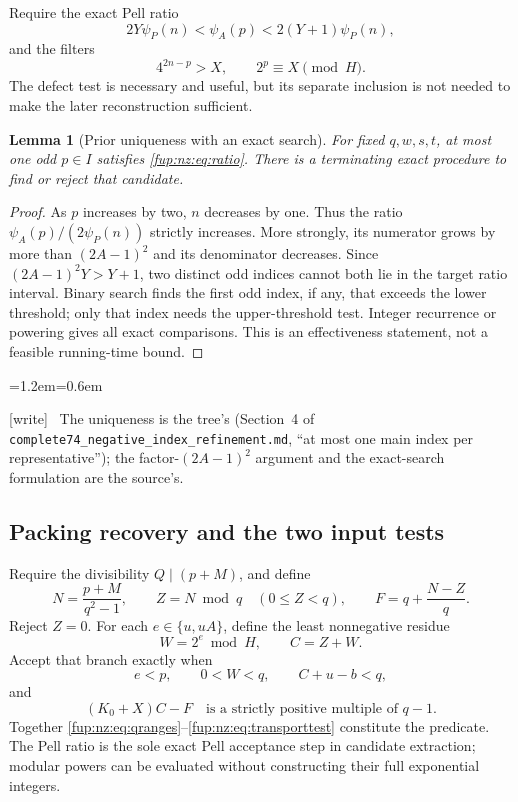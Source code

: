 \documentclass[11pt,letterpaper]{article}
\newtheorem{lemma}[theorem]{Lemma}
\theoremstyle{definition}\newtheorem{definition}[theorem]{Definition}
\theoremstyle{remark}\newtheorem{remark}[theorem]{Remark}
\newcommand{\wtag}{\textup{[write]}}
\newenvironment{writenote}{\par\smallskip\begin{list}{}{\leftmargin=1.2em\rightmargin=0.6em}\item[]\small\wtag\ }{\end{list}\smallskip}
\newcommand{\rw}[1]{\nolinkurl{#1}}%
\begin{document}
Require the exact Pell ratio
\begin{equation}\label{fup:nz:eq:ratio}
 2Y\psi_P(n)<\psi_A(p)<2(Y+1)\psi_P(n),
\end{equation}
and the filters
\begin{equation}\label{fup:nz:eq:mainfilters}
 4^{2n-p}>X,\qquad 2^p\equiv X\pmod H.
\end{equation}
The defect test is necessary and useful, but its separate inclusion is not needed to make the later reconstruction sufficient.

\begin{lemma}[Prior uniqueness with an exact search]\label{fup:nz:lem:unique}
For fixed $q,w,s,t$, at most one odd $p\in I$ satisfies \eqref{fup:nz:eq:ratio}. There is a terminating exact procedure to find or reject that candidate.
\end{lemma}
\begin{proof}
As $p$ increases by two, $n$ decreases by one. Thus the ratio $\psi_A(p)/(2\psi_P(n))$ strictly increases. More strongly, its numerator grows by more than $(2A-1)^2$ and its denominator decreases. Since $(2A-1)^2Y>Y+1$, two distinct odd indices cannot both lie in the target ratio interval. Binary search finds the first odd index, if any, that exceeds the lower threshold; only that index needs the upper-threshold test. Integer recurrence or powering gives all exact comparisons. This is an effectiveness statement, not a feasible running-time bound.
\end{proof}
\begin{writenote}
The uniqueness is the tree's (Section~4 of \rw{complete74_negative_index_refinement.md}, ``at most one main index per representative''); the factor-$(2A-1)^2$ argument and the exact-search formulation are the source's.
\end{writenote}

\subsection{Packing recovery and the two input tests}
Require the divisibility $Q\mid(p+M)$, and define
\begin{equation}\label{fup:nz:eq:recover}
 N=\frac{p+M}{q^2-1},\qquad Z=N\bmod q\quad(0\le Z<q),\qquad
 F=q+\frac{N-Z}{q}.
\end{equation}
Reject $Z=0$. For each $e\in\{u,uA\}$, define the least nonnegative residue
\begin{equation}\label{fup:nz:eq:W}
 W=2^e\bmod H,\qquad C=Z+W.
\end{equation}
Accept that branch exactly when
\begin{equation}\label{fup:nz:eq:inputtests}
 e<p,\qquad 0<W<q,\qquad C+u-b<q,
\end{equation}
and
\begin{equation}\label{fup:nz:eq:transporttest}
 (K_0+X)C-F\quad\text{is a strictly positive multiple of }q-1.
\end{equation}
Together \eqref{fup:nz:eq:qranges}--\eqref{fup:nz:eq:transporttest} constitute the predicate. The Pell ratio is the sole exact Pell acceptance step in candidate extraction; modular powers can be evaluated without constructing their full exponential integers.
\end{document}
